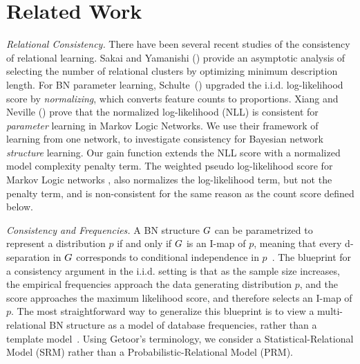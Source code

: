 \documentclass{article}
\begin{document}
\section{Related Work}


\label{sec:related}

{\em Relational Consistency.} There have been several recent studies of the consistency of relational learning. Sakai and Yamanishi 
(\citeyear{Sakai2013}) provide an asymptotic analysis of selecting the number of relational clusters by optimizing minimum description length. For BN parameter learning, Schulte~(\citeyear{Schulte2011}) upgraded the i.i.d. log-likelihood score by {\em normalizing}, which converts feature counts to proportions.
Xiang and Neville (\citeyear{Xiang2011}) prove that the normalized log-likelihood (NLL) is consistent for {\em parameter} learning in Markov Logic Networks.  
We use their framework of learning from one network, to investigate consistency for  Bayesian network {\em  structure} learning. 
 Our gain function extends the NLL score with a normalized model complexity penalty term. The weighted pseudo log-likelihood score %
 for Markov Logic networks \cite{Lowd2007}, also normalizes the log-likelihood term, but not the penalty term, and is non-consistent for the same reason as the count score defined below.

{\em Consistency and Frequencies.} A BN structure $G$ can be parametrized to represent a distribution $p$ if and only if $G$ is an I-map of $p$, meaning that every d-separation in $G$ corresponds to conditional independence in $p$~\cite{Pearl1988}. The blueprint for a consistency argument 
in the i.i.d. setting is that as the sample size increases, the empirical frequencies approach the data generating distribution $p$, and the score approaches the maximum likelihood score, and therefore selects an I-map of $p$. The most straightforward way to generalize this blueprint is to view a multi-relational BN structure as a model of database frequencies, rather than a template model~\cite{Getoor2001a,Schulte2014}. Using Getoor's terminology, we consider a Statistical-Relational Model (SRM) rather than a  Probabilistic-Relational Model (PRM).
\end{document}

